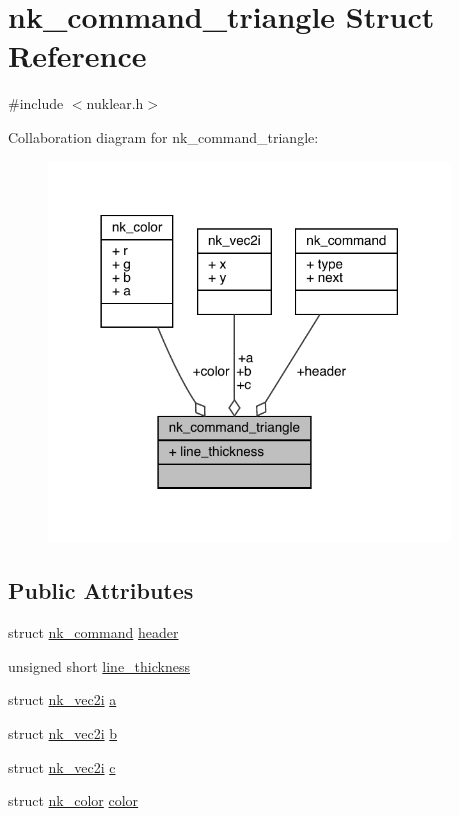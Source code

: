 \hypertarget{structnk__command__triangle}{}\section{nk\+\_\+command\+\_\+triangle Struct Reference}
\label{structnk__command__triangle}


{\ttfamily \#include $<$nuklear.\+h$>$}



Collaboration diagram for nk\+\_\+command\+\_\+triangle\+:
\nopagebreak
\begin{figure}[H]
\begin{center}
\leavevmode
\includegraphics[width=302pt]{structnk__command__triangle__coll__graph}
\end{center}
\end{figure}
\subsection*{Public Attributes}
\begin{DoxyCompactItemize}
\item 
struct \mbox{\hyperlink{structnk__command}{nk\+\_\+command}} \mbox{\hyperlink{structnk__command__triangle_ae39911e004d052d2546ea9a013eac7c2}{header}}
\item 
unsigned short \mbox{\hyperlink{structnk__command__triangle_a1a7b8926b82bbcd507142fbb337518f7}{line\+\_\+thickness}}
\item 
struct \mbox{\hyperlink{structnk__vec2i}{nk\+\_\+vec2i}} \mbox{\hyperlink{structnk__command__triangle_a3075515b028883cd55113bd830cc3b19}{a}}
\item 
struct \mbox{\hyperlink{structnk__vec2i}{nk\+\_\+vec2i}} \mbox{\hyperlink{structnk__command__triangle_a50fdee47bcbf228ac6948f7f501a7f31}{b}}
\item 
struct \mbox{\hyperlink{structnk__vec2i}{nk\+\_\+vec2i}} \mbox{\hyperlink{structnk__command__triangle_a66cc7af34255c6b6e6949ee7ce1f6539}{c}}
\item 
struct \mbox{\hyperlink{structnk__color}{nk\+\_\+color}} \mbox{\hyperlink{structnk__command__triangle_ae3698f324f8c4c5d654307c46d903b2b}{color}}
\end{DoxyCompactItemize}


